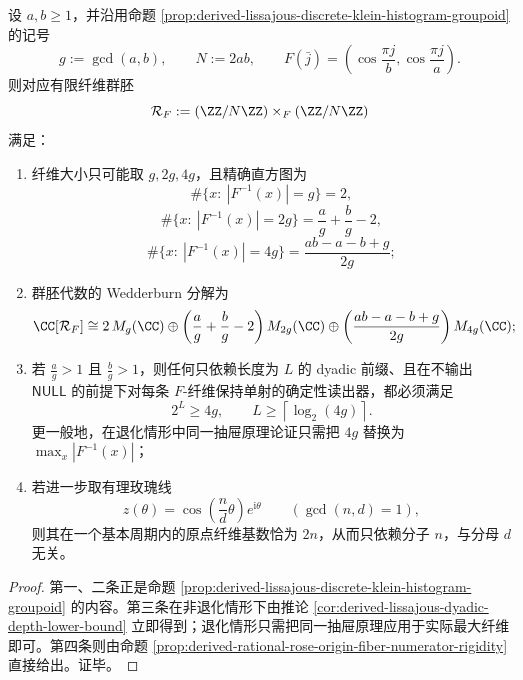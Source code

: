 \begin{theorem}\label{thm:derived-lissajous-exact-histogram-dyadic-threshold}
设 \(a,b\ge 1\)，并沿用命题 \ref{prop:derived-lissajous-discrete-klein-histogram-groupoid} 的记号
\[
g:=\gcd(a,b),
\qquad
N:=2ab,
\qquad
F(\bar j)=\left(\cos\frac{\pi j}{b},\cos\frac{\pi j}{a}\right).
\]
则对应有限纤维群胚
\[
\mathcal R_F:=(\ZZ/N\ZZ)\times_F(\ZZ/N\ZZ)
\]
满足：
\begin{enumerate}
  \item 纤维大小只可能取 \(g,2g,4g\)，且精确直方图为
  \[
  \#\{x:\ |F^{-1}(x)|=g\}=2,
  \]
  \[
  \#\{x:\ |F^{-1}(x)|=2g\}=\frac{a}{g}+\frac{b}{g}-2,
  \]
  \[
  \#\{x:\ |F^{-1}(x)|=4g\}=\frac{ab-a-b+g}{2g};
  \]
  \item 群胚代数的 Wedderburn 分解为
  \[
  \CC[\mathcal R_F]
  \cong
  2\,M_g(\CC)
  \oplus
  \left(\frac{a}{g}+\frac{b}{g}-2\right)M_{2g}(\CC)
  \oplus
  \left(\frac{ab-a-b+g}{2g}\right)M_{4g}(\CC);
  \]
  \item 若 \(\frac{a}{g}>1\) 且 \(\frac{b}{g}>1\)，则任何只依赖长度为 \(L\) 的 dyadic 前缀、且在不输出 \(\mathsf{NULL}\) 的前提下对每条 \(F\)-纤维保持单射的确定性读出器，都必须满足
  \[
  2^L\ge 4g,
  \qquad
  L\ge \left\lceil\log_2(4g)\right\rceil.
  \]
  更一般地，在退化情形中同一抽屉原理论证只需把 \(4g\) 替换为 \(\max_x|F^{-1}(x)|\)；
  \item 若进一步取有理玫瑰线
  \[
  z(\theta)=\cos\!\left(\frac{n}{d}\theta\right)e^{\mathrm i\theta}
  \qquad
  (\gcd(n,d)=1),
  \]
  则其在一个基本周期内的原点纤维基数恰为 \(2n\)，从而只依赖分子 \(n\)，与分母 \(d\) 无关。
\end{enumerate}
\end{theorem}

\begin{proof}
第一、二条正是命题 \ref{prop:derived-lissajous-discrete-klein-histogram-groupoid} 的内容。第三条在非退化情形下由推论 \ref{cor:derived-lissajous-dyadic-depth-lower-bound} 立即得到；退化情形只需把同一抽屉原理应用于实际最大纤维即可。第四条则由命题 \ref{prop:derived-rational-rose-origin-fiber-numerator-rigidity} 直接给出。证毕。
\end{proof}

